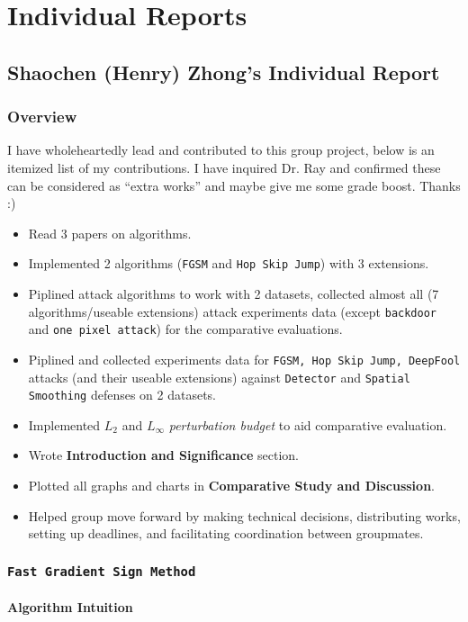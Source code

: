 \documentclass[11pt]{article}
\newcommand{\ilc}{\texttt}
\begin{document}
\section{Individual Reports}

\subsection{Shaochen (Henry) Zhong's Individual Report}
\subsubsection{Overview}

I have wholeheartedly lead and contributed to this group project, below is an itemized list of my contributions. I have inquired Dr. Ray and confirmed these can be considered as ``extra works'' and maybe give me some grade boost. Thanks :)
\begin{itemize}
    \item Read 3 papers on algorithms.
    \item Implemented 2 algorithms (\ilc{FGSM} and \ilc{Hop Skip Jump}) with 3 extensions.
    \item Piplined attack algorithms to work with 2 datasets, collected almost all (7 algorithms/useable extensions) attack experiments data (except \ilc{backdoor} and \ilc{one pixel attack}) for the comparative evaluations.
    \item Piplined and collected experiments data for \ilc{FGSM, Hop Skip Jump, DeepFool} attacks (and their useable extensions) against \ilc{Detector} and \ilc{Spatial Smoothing} defenses on 2 datasets.
    \item Implemented $L_2$ and $L_{\infty}$ \textit{perturbation budget} to aid comparative evaluation.
    \item Wrote \textbf{Introduction and Significance} section.
    \item Plotted all graphs and charts in \textbf{Comparative Study and Discussion}.
    \item Helped group move forward by making technical decisions, distributing works, setting up deadlines, and facilitating coordination between groupmates.
\end{itemize}

\subsubsection{\ilc{Fast Gradient Sign Method}}
\paragraph{Algorithm Intuition}
\end{document}
